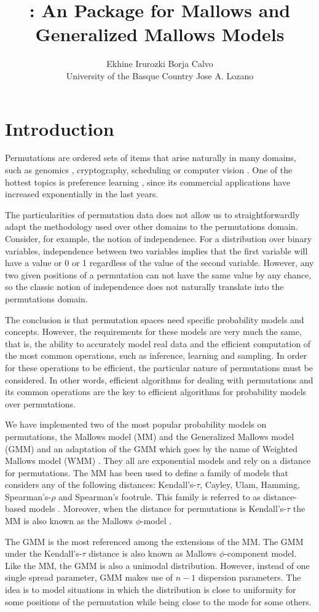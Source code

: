 \documentclass[article,nojss]{jss}
\author{
	Ekhine Irurozki %
	\And 
	Borja Calvo \\ University of the Basque Country
	\And
	Jose A. Lozano \\ %
        }
\title{\pkg{PerMallows}: An \proglang{R} Package for Mallows and Generalized Mallows Models}
\begin{document}
\section{Introduction} 
Permutations are ordered sets of items that arise naturally in many domains, such as genomics \citep{Bader11}, cryptography, scheduling or computer vision \citep{NIPS2012_0012}. One of the hottest topics is preference learning \citep{Preferences}, since its commercial applications have increased exponentially in the last years. 

The particularities of permutation data does not allow us to straightforwardly adapt the methodology used over other domains to the permutations domain. Consider, for example, the notion of independence. For a distribution over binary variables, independence between two variables implies that the first variable will have a value or 0 or 1 regardless of the value of the second variable. However, any two given positions of a permutation can not have the same value by any chance, so the classic notion of independence does not naturally translate into the permutations domain. 

The conclusion is that permutation spaces need specific probability models and concepts. However, the requirements for these models are very much the same, that is, the ability to accurately model real data and the efficient computation of the most common operations, such as inference, learning and sampling. In order for these operations to be efficient, the particular nature of permutations must be considered. In other words, efficient algorithms for dealing with permutations and its common operations are the key to efficient algorithms for probability models over permutations. 

We have implemented two of the most popular probability models on permutations, the Mallows model (MM) \citep{mallows} and the Generalized Mallows model (GMM) \citep{gMallows} and an adaptation of the GMM which goes by the name of Weighted Mallows model (WMM) \citep{Irurozki2014a}. They all are exponential models and rely on a distance for permutations. The MM has been used to define a family of models that considers any of the following distances: Kendall's-$\tau$, Cayley, Ulam, Hamming, Spearman's-$\rho$ and Spearman's footrule. This family is referred to as distance-based models \citep{diaconis88}. Moreover, when the distance for permutations is Kendall's-$\tau$ the MM is also known as the Mallows $\phi$-model \citep{critchlow91}. 

The GMM is the most referenced among the extensions of the MM. The GMM under the Kendall's-$\tau$ distance is also known as Mallows $\phi$-component model. Like the MM, the GMM is also a unimodal distribution. However, instead of one single spread parameter, GMM makes use of $n-1$ dispersion parameters. The idea is to model situations in which the distribution is close to uniformity for some positions of the permutation while being close to the mode for some others. 
\end{document}
